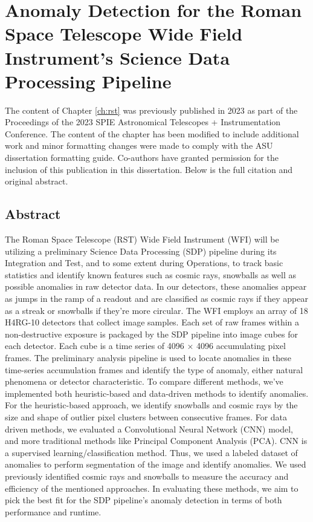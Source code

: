 \section{Anomaly Detection for the Roman Space Telescope Wide Field Instrument’s Science Data Processing Pipeline}
The content of Chapter \ref{ch:rst} was previously published in 2023 as part of the Proceedings of the 2023 SPIE Astronomical Telescopes + Instrumentation Conference.
The content of the chapter has been modified to include additional work and minor formatting changes were made to comply with the ASU dissertation formatting guide.
Co-authors have granted permission for the inclusion of this publication in this dissertation. 
Below is the full citation and original abstract.
\begin{refsection}
  \nocite{horton2024anomaly}
  \printbibliography[heading=none]
\end{refsection}
\subsection{Abstract}
The Roman Space Telescope (RST) Wide Field Instrument (WFI) will be utilizing a preliminary Science Data Processing (SDP) pipeline during its Integration and Test, and to some extent during Operations, to track basic statistics and identify known features such as cosmic rays, snowballs as well as possible anomalies in raw detector data. In our detectors, these anomalies appear as jumps in the ramp of a readout and are classified as cosmic rays if they appear as a streak or snowballs if they’re more circular. The WFI employs an array of 18 H4RG-10 detectors that collect image samples. Each set of raw frames within a non-destructive exposure is packaged by the SDP pipeline into image cubes for each detector. Each cube is a time series of 4096 × 4096 accumulating pixel frames. The preliminary analysis pipeline is used to locate anomalies in these time-series accumulation frames and identify the type of anomaly, either natural phenomena or detector characteristic. To compare different methods, we’ve implemented both heuristic-based and data-driven methods to identify anomalies. For the heuristic-based approach, we identify snowballs and cosmic rays by the size and shape of outlier pixel clusters between consecutive frames. For data driven methods, we evaluated a Convolutional Neural Network (CNN) model, and more traditional methods like Principal Component Analysis (PCA). CNN is a supervised learning/classification method. Thus, we used a labeled dataset of anomalies to perform segmentation of the image and identify anomalies. We used previously identified cosmic rays and snowballs to measure the accuracy and efficiency of the mentioned approaches. In evaluating these methods, we aim to pick the best fit for the SDP pipeline’s anomaly detection in terms of both performance and runtime.

